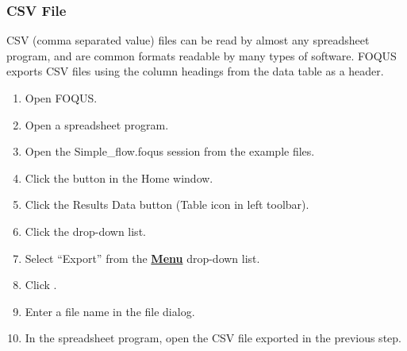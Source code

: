 \subsubsection{CSV File}

CSV (comma separated value) files can be read by almost any spreadsheet program, and are common formats readable by many types of software. FOQUS exports CSV files using the column headings from the data table as a header.

\begin{enumerate}
 	\item Open FOQUS.
 	\item Open a spreadsheet program.
 	\item Open the Simple\_flow.foqus session from the example files.
 	\item Click the  button in the Home window.
 	\item Click the Results Data button (Table icon in left toolbar).
 	\item Click the  drop-down list.
 	\item Select ``Export'' from the \textbf{\underline{Menu}} drop-down list.
 	\item Click .
 	\item Enter a file name in the file dialog.
 	\item In the spreadsheet program, open the CSV file exported in the previous step.
\end{enumerate}
